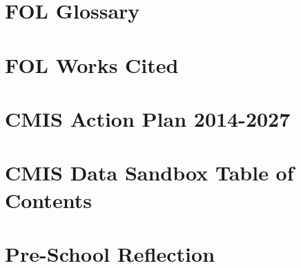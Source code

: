 \documentclass{report}
\begin{document}
\section{FOL Glossary}

\section{FOL Works Cited}

\section{CMIS Action Plan 2014-2027}

\section{CMIS Data Sandbox Table of Contents}

\section{Pre-School Reflection}

\end{document}
